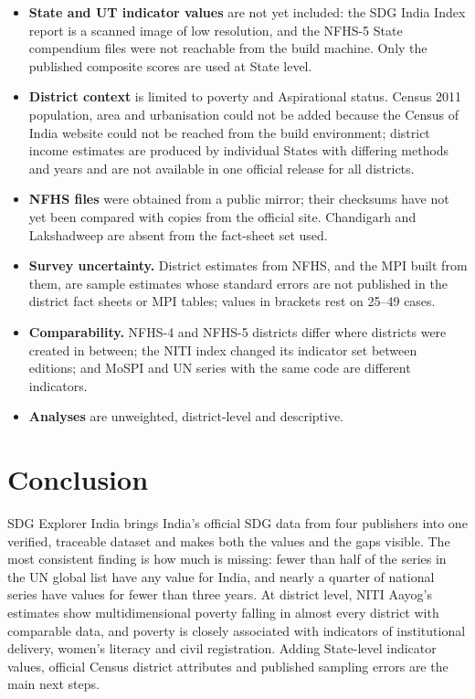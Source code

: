 \documentclass[11pt,a4paper]{article}
\begin{document}
\begin{itemize}
  \item \textbf{State and UT indicator values} are not yet included: the SDG India Index report is a scanned image of low resolution, and the NFHS-5 State compendium files were not reachable from the build machine. Only the published composite scores are used at State level.
  \item \textbf{District context} is limited to poverty and Aspirational status. Census 2011 population, area and urbanisation could not be added because the Census of India website could not be reached from the build environment; district income estimates are produced by individual States with differing methods and years and are not available in one official release for all districts.
  \item \textbf{NFHS files} were obtained from a public mirror; their checksums have not yet been compared with copies from the official site. Chandigarh and Lakshadweep are absent from the fact-sheet set used.
  \item \textbf{Survey uncertainty.} District estimates from NFHS, and the MPI built from them, are sample estimates whose standard errors are not published in the district fact sheets or MPI tables; values in brackets rest on 25--49 cases.
  \item \textbf{Comparability.} NFHS-4 and NFHS-5 districts differ where districts were created in between; the NITI index changed its indicator set between editions; and MoSPI and UN series with the same code are different indicators.
  \item \textbf{Analyses} are unweighted, district-level and descriptive.
\end{itemize}

\section{Conclusion}

SDG Explorer India brings India's official SDG data from four publishers into one verified, traceable dataset and makes both the values and the gaps visible. The most consistent finding is how much is missing: fewer than half of the series in the UN global list have any value for India, and nearly a quarter of national series have values for fewer than three years. At district level, NITI Aayog's estimates show multidimensional poverty falling in almost every district with comparable data, and poverty is closely associated with indicators of institutional delivery, women's literacy and civil registration. Adding State-level indicator values, official Census district attributes and published sampling errors are the main next steps.
\end{document}
